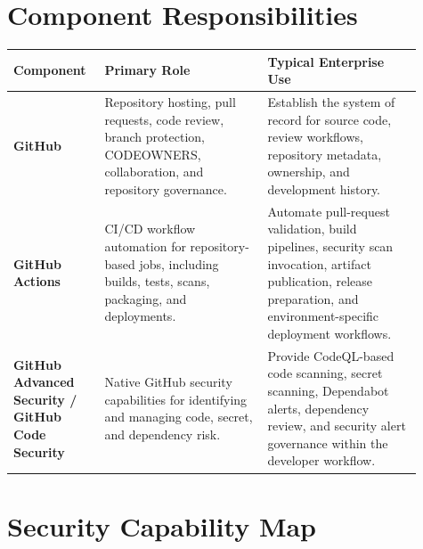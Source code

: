\documentclass[11pt]{article}
\providecommand{\term}[1]{\textbf{#1}}
\begin{document}
\section{Component Responsibilities}

\begin{longtable}{>{\raggedright\arraybackslash}p{0.19\linewidth} >{\raggedright\arraybackslash}p{0.37\linewidth} >{\raggedright\arraybackslash}p{0.35\linewidth}}
\toprule
\textbf{Component} & \textbf{Primary Role} & \textbf{Typical Enterprise Use} \\
\midrule
\endhead
\term{GitHub} & Repository hosting, pull requests, code review, branch protection, CODEOWNERS, collaboration, and repository governance. & Establish the system of record for source code, review workflows, repository metadata, ownership, and development history. \\
\midrule
\term{GitHub Actions} & CI/CD workflow automation for repository-based jobs, including builds, tests, scans, packaging, and deployments.\cite{github-actions-understanding} & Automate pull-request validation, build pipelines, security scan invocation, artifact publication, release preparation, and environment-specific deployment workflows. \\
\midrule
\term{GitHub Advanced Security / GitHub Code Security} & Native GitHub security capabilities for identifying and managing code, secret, and dependency risk.\cite{github-ghas-about} & Provide CodeQL-based code scanning, secret scanning, Dependabot alerts, dependency review, and security alert governance within the developer workflow. \\
\bottomrule
\end{longtable}

\section{Security Capability Map}
\end{document}
